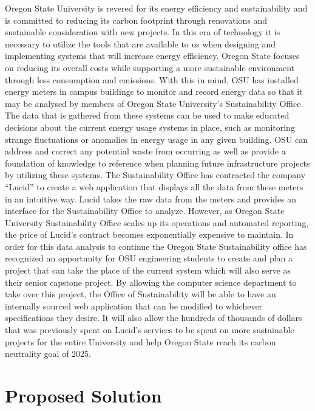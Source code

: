 \documentclass[onecolumn, draftclsnofoot,10pt, compsoc]{IEEEtran}
\begin{document}
	\indent Oregon State University is revered for its energy efficiency and sustainability and is committed to reducing its carbon footprint through renovations and sustainable consideration with new projects. In this era of technology it is necessary to utilize the tools that are available to us when designing and implementing systems that will increase energy efficiency. Oregon State focuses on reducing its overall costs while supporting a more sustainable environment through less consumption and emissions. With this in mind, OSU has installed energy meters in campus buildings  to monitor and record energy data so that it may be analysed by members of Oregon State University's Sustainability Office.  The data that is gathered from these systems can be used to make educated decisions about the current energy usage systems in place, such as monitoring strange fluctuations or anomalies in energy usage in any given building. OSU can address and correct any potential waste from occurring as well as provide a foundation of knowledge to reference when planning future infrastructure projects by utilizing these systems. The Sustainability Office has contracted the company “Lucid” to create a web application that displays all the data from these meters in an intuitive way. Lucid takes the raw data from the meters and provides an interface for the Sustainability Office to analyze. However, as Oregon State University Sustainability Office scales up its operations and automated reporting, the price of Lucid’s contract becomes exponentially expensive to maintain.  In order for this data analysis to continue the Oregon State Sustainability office has recognized an opportunity for OSU engineering students to create and plan a project that can take the place of the current system which will also serve as their senior capstone project. By allowing the computer science department to take over this project, the Office of Sustainability will be able to have an internally sourced web application that can be modified to whichever specifications they desire. It will also allow the hundreds of thousands of dollars that was previously spent on Lucid’s services to be spent on more sustainable projects for the entire University and help Oregon State reach its carbon neutrality goal of 2025.
    \newpage
    \section{Proposed Solution}
    \newpage
\end{document}

